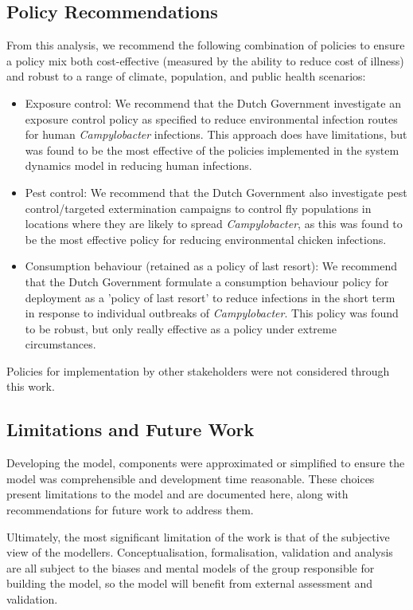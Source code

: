\subsection{Policy Recommendations}
From this analysis, we recommend the following combination of policies to ensure a policy mix both cost-effective (measured by the ability to reduce cost of illness) and robust to a range of climate, population, and public health scenarios:
\begin{itemize}
    \item Exposure control: We recommend that the Dutch Government investigate an exposure control policy as specified to reduce environmental infection routes for human \textit{Campylobacter} infections. This approach does have limitations, but was found to be the most effective of the policies implemented in the system dynamics model in reducing human infections.
    \item Pest control: We recommend that the Dutch Government also investigate pest control/targeted extermination campaigns to control fly populations in locations where they are likely to spread \textit{Campylobacter}, as this was found to be the most effective policy for reducing environmental chicken infections.
    \item Consumption behaviour (retained as a policy of last resort): We recommend that the Dutch Government formulate a consumption behaviour policy for deployment as a 'policy of last resort' to reduce infections in the short term in response to individual outbreaks of \textit{Campylobacter}. This policy was found to be robust, but only really effective as a policy under extreme circumstances.
\end{itemize}

Policies for implementation by other stakeholders were not considered through this work.

\subsection{Limitations and Future Work}

Developing the model, components were approximated or simplified to ensure the model was comprehensible and development time reasonable. These choices present limitations to the model and are documented here, along with recommendations for future work to address them.

Ultimately, the most significant limitation of the work is that of the subjective view of the modellers. Conceptualisation, formalisation, validation and analysis are all subject to the biases and mental models of the group responsible for building the model, so the model will benefit from external assessment and validation.

